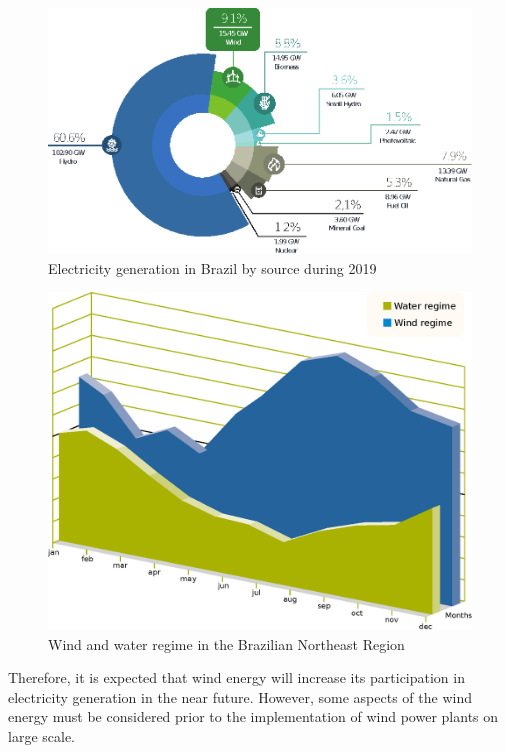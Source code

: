 \begin{figure}[ht]
	\caption{Electricity generation in Brazil by source during 2019}
	\begin{center}
		\includegraphics[scale=0.8]{Images/BRshare20.eps}
	\end{center}
	\label{fig: BRshare}
\end{figure}

\begin{figure}[hb]
	\caption{Wind and water regime in the Brazilian Northeast Region}
	\begin{center}
		\includegraphics[scale=0.5]{Images/WindWater.eps}
	\end{center}
	\label{fig: WindWater}
\end{figure}

Therefore, it is expected that wind energy will increase its participation in electricity generation in the near future. However, some aspects of the wind energy must be considered prior to the implementation of wind power plants on large scale.


